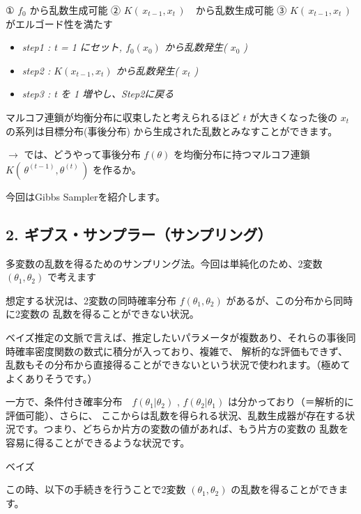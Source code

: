 \documentclass[
]{article}
\providecommand{\tightlist}{%
  \setlength{\itemsep}{0pt}\setlength{\parskip}{0pt}}
\begin{document}
① \(f_0\) から乱数生成可能 ② \(K(\,x_{t-1},x_t\,)\)　から乱数生成可能 ③
\(K(\,x_{t-1},x_t\,)\)　がエルゴード性を満たす

\begin{itemize}
\tightlist
\item
  \emph{step1 : t = 1 にセット, \(f_0(x_0)\) から乱数発生( \(x_0\) )}
\item
  \emph{step2 : \(K(x_{t-1},x_t)\) から乱数発生( \(x_t\) )}
\item
  \emph{step3 : t を 1 増やし、Step2に戻る} 
\end{itemize}

マルコフ連鎖が均衡分布に収束したと考えられるほど \(t\)
が大きくなった後の \(x_t\) の系列は目標分布(事後分布)
から生成された乱数とみなすことができます。

\(\rightarrow\) では、どうやって事後分布 \(f(\theta)\)
を均衡分布に持つマルコフ連鎖　\(K(\,\theta^{(t-1)},\theta^{(t)}\,)\)
を作るか。

今回はGibbs Samplerを紹介します。

\hypertarget{ux30aeux30d6ux30b9ux30b5ux30f3ux30d7ux30e9ux30fcux30b5ux30f3ux30d7ux30eaux30f3ux30b0}{%
\subsection{\texorpdfstring{\textbf{2.
ギブス・サンプラー（サンプリング）}}{2. ギブス・サンプラー（サンプリング）}}\label{ux30aeux30d6ux30b9ux30b5ux30f3ux30d7ux30e9ux30fcux30b5ux30f3ux30d7ux30eaux30f3ux30b0}}

多変数の乱数を得るためのサンプリング法。今回は単純化のため、2変数
\((\theta_1,\theta_2)\) で考えます

想定する状況は、2変数の同時確率分布 \(f(\theta_1,\theta_2)\)
があるが、この分布から同時に2変数の 乱数を得ることができない状況。

ベイズ推定の文脈で言えば、推定したいパラメータが複数あり、それらの事後同時確率密度関数の数式に積分が入っており、複雑で、
解析的な評価もできず、乱数もその分布から直接得ることができないという状況で使われます。（極めてよくありそうです。）

一方で、条件付き確率分布　\(f(\theta_1|\theta_2)\) ,
\(f(\theta_2|\theta_1)\) は分かっており（＝解析的に評価可能）、さらに、
ここからは乱数を得られる状況、乱数生成器が存在する状況です。つまり、どちらか片方の変数の値があれば、もう片方の変数の
乱数を容易に得ることができるような状況です。

ベイズ

この時、以下の手続きを行うことで2変数 \((\theta_1,\theta_2)\)
の乱数を得ることができます。
\end{document}
